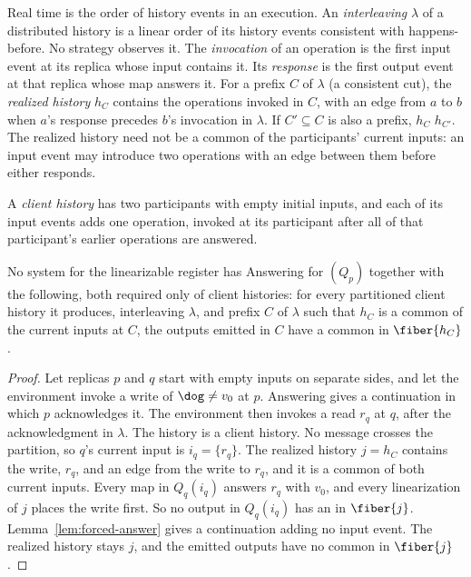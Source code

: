 Real time is the order of history events in an execution.  An
\emph{interleaving} $\lambda$ of a distributed history is a linear order of
its history events consistent with happens-before.  No strategy observes it.
The \emph{invocation} of an operation is the first input event at its replica
whose input contains it.  Its \emph{response} is the first output event at
that replica whose map answers it.  For a prefix $C$ of $\lambda$ (a
consistent cut), the \emph{realized history} $h_C$ contains the operations
invoked in $C$, with an edge from $a$ to $b$ when $a$'s response precedes
$b$'s invocation in $\lambda$.  If $C'\subseteq C$ is also a prefix, $h_C$
\inrel $h_{C'}$.  The realized history need not be a common \indesc of the
participants' current inputs: an input event may introduce two operations with
an edge between them before either responds.

A \emph{client history} has two participants with empty initial inputs, and
each of its input events adds one operation, invoked at its participant after
all of that participant's earlier operations are answered.

\begin{corollary}
\label{cor:gilbert-lynch}
No system for the linearizable register has Answering for $(Q_p)$ together
with the following, both required only of client histories: for every
partitioned client history it produces, interleaving $\lambda$, and prefix $C$
of $\lambda$ such that $h_C$ is a common \indesc of the current inputs at $C$,
the outputs emitted in $C$ have a common \outnoun in $\fiber{h_C}$.
\end{corollary}

\begin{proof}
Let replicas $p$ and $q$ start with empty inputs on separate sides, and let
the environment invoke a write of $\dog\neq v_0$ at $p$.  Answering gives a
continuation in which $p$ acknowledges it.  The environment then invokes a read
$r_q$ at $q$, after the acknowledgment in $\lambda$.  The history is a client
history.  No message crosses the partition, so $q$'s current input is
$i_q=\{r_q\}$.  The realized history $j=h_C$ contains the write, $r_q$, and an
edge from the write to $r_q$, and it is a common \indesc of both current
inputs.  Every map in $Q_q(i_q)$ answers $r_q$ with $v_0$, and every
linearization of $j$ places the write first.  So no output in $Q_q(i_q)$ has
an \outnoun in $\fiber{j}$.  Lemma~\ref{lem:forced-answer} gives a
continuation adding no input event.  The realized history stays $j$, and the
emitted outputs have no common \outnoun in $\fiber{j}$.
\end{proof}

